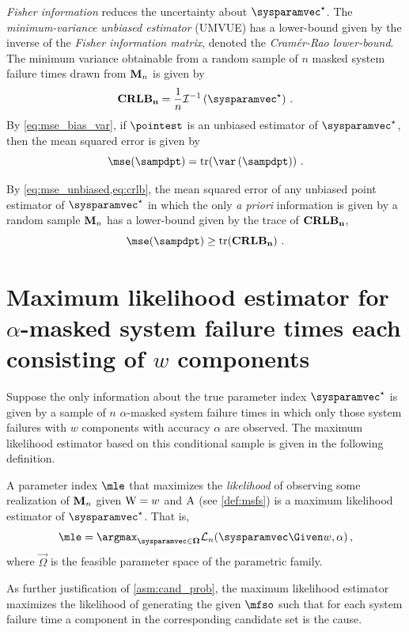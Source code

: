 \documentclass[ ../main.tex]{subfiles}
\begin{document}
\emph{Fisher information} reduces the uncertainty about $\tparam\sysparamvec$.
The \emph{minimum-variance unbiased estimator} (UMVUE) has a lower-bound given by the inverse of the \emph{Fisher information matrix}, denoted the \emph{Cram\'{e}r-Rao lower-bound}.
The minimum variance obtainable from a random sample of $n$ masked system failure times drawn from $\mathbf{M}_n$ is given by
\begin{equation}
\label{eq:crlb}
    \matrx{CRLB_n} = \frac{1}{n} \infomatrx^{-1}\left(\tparam\sysparamvec 
    \right)\,.
\end{equation}
By \cref{eq:mse_bias_var}, if $\pointest$ is an unbiased estimator of $\tparam\sysparamvec$, then the mean squared error is given by
\begin{equation}
\label{eq:mse_unbiased}
\mse(\sampdpt) = \trace\!\left( \var\left(\sampdpt\right) \right)\,.
\end{equation}

By \cref{eq:mse_unbiased,eq:crlb}, the mean squared error of any unbiased point 
estimator of $\tparam\sysparamvec$ in which the only \emph{a priori} 
information is given by a random sample $\mathbf{M}_n$ has a lower-bound given by the 
trace of $\mathbf{CRLB_n}$,
\begin{equation}
\label{eq:mse_lower_bound_total}
\mse(\sampdpt) \geq \trace\!\left(\matrx{CRLB_n}\right)\,.
\end{equation}

\section{Maximum likelihood estimator for $\alpha$-masked system failure times each consisting of $w$ components}
Suppose the only information about the true parameter index $\tparam\sysparamvec$ is given by a sample of $n$ $\alpha$-masked system failure times in which only those system failures with $w$ components with accuracy $\alpha$ are observed.
The maximum likelihood estimator based on this conditional sample is given in the following definition.
\begin{definition}
\label{def:general_mle}
A parameter index $\mle$ that maximizes the \emph{likelihood} of observing some realization of $\mathbf{M}_n$ given $\mathrm{W} = w$ and $\mathrm{A}$ (see \cref{def:msfs}) is a maximum likelihood estimator of $\tparam\sysparamvec$.
That is,
\begin{equation}
\label{eq:general_mle}
\mle = \argmax_{\sysparamvec \in \vec\Omega} \likelihood_n(\sysparamvec \Given w, \alpha)\,,
\end{equation}
where $\vec\Omega$ is the feasible parameter space of the parametric family.
\end{definition}
As further justification of \cref{asm:cand_prob}, the maximum likelihood estimator maximizes the likelihood of generating the given $\mfso$ such that for each system failure time a component in the corresponding candidate set is the cause.
\end{document}
